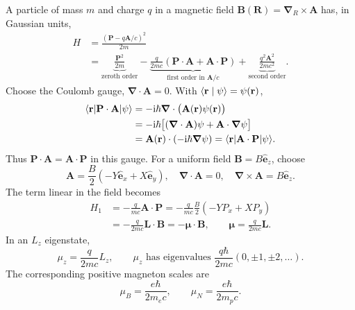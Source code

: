 A particle of mass $m$ and charge $q$ in a magnetic field
$\mathbf B(\mathbf R)=\boldsymbol\nabla_R\times\mathbf A$ has, in Gaussian
units,
\begin{align*}
 H&=\frac{(\mathbf P-q\mathbf A/c)^2}{2m}\\
  &=\underbrace{\frac{\mathbf P^2}{2m}}_{\text{zeroth order}}
    -\underbrace{\frac{q}{2mc}(\mathbf P\cdot\mathbf A+
                                \mathbf A\cdot\mathbf P)}_{\text{first order in }\mathbf A/c}
    +\underbrace{\frac{q^2\mathbf A^2}{2mc^2}}_{\text{second order}}.
\end{align*}
Choose the Coulomb gauge, $\boldsymbol\nabla\cdot\mathbf A=0$. With
$\langle \mathbf r\mid \psi\rangle=\psi(\mathbf r)$,
\begin{align*}
 \langle \mathbf r\rvert \mathbf P\cdot\mathbf A\lvert \psi\rangle
 &=-\mathrm{i}\hbar\boldsymbol\nabla\cdot\bigl(\mathbf A(\mathbf r)\psi(\mathbf r)\bigr)\\
 &=-\mathrm{i}\hbar\bigl[(\boldsymbol\nabla\cdot\mathbf A)\psi
                         +\mathbf A\cdot\boldsymbol\nabla\psi\bigr]\\
 &=\mathbf A(\mathbf r)\cdot(-\mathrm{i}\hbar\boldsymbol\nabla\psi)
  =\langle \mathbf r\rvert \mathbf A\cdot\mathbf P\lvert \psi\rangle.
\end{align*}
Thus $\mathbf P\cdot\mathbf A=\mathbf A\cdot\mathbf P$ in this gauge.
For a uniform field $\mathbf B=B\hat{\mathbf e}_z$, choose
\[
 \mathbf A=\frac B2(-Y\hat{\mathbf e}_x+X\hat{\mathbf e}_y),
 \quad\boldsymbol\nabla\cdot\mathbf A=0,
 \quad\boldsymbol\nabla\times\mathbf A=B\hat{\mathbf e}_z.
\]
The term linear in the field becomes
\begin{align*}
 H_1&=-\frac q{mc}\mathbf A\cdot\mathbf P
     =-\frac q{mc}\frac B2(-YP_x+XP_y)\\
    &=-\frac q{2mc}\mathbf L\cdot\mathbf B
     =-\boldsymbol\mu\cdot\mathbf B,
 \qquad \boldsymbol\mu=\frac q{2mc}\mathbf L.
\end{align*}
In an $L_z$ eigenstate,
\[
 \mu_z=\frac q{2mc}L_z,
 \qquad\mu_z\text{ has eigenvalues }\frac{q\hbar}{2mc}(0,\pm1,\pm2,\ldots).
\]
The corresponding positive magneton scales are
\[
 \mu_B=\frac{e\hbar}{2m_ec},\qquad
 \mu_N=\frac{e\hbar}{2m_pc}.
\]

